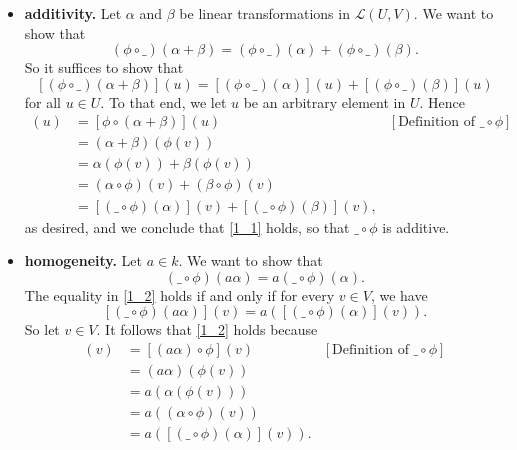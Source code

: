 \documentclass[9pt]{article}
\begin{document}
\begin{enumerate}
      \begin{itemize}
         \item \textbf{additivity.} Let $\alpha$ and $\beta$ be linear
               transformations in $\mathcal{L}(U, V)$. We want to show that
               \begin{equation} \label{1_3}
                  (\phi\circ\_)(\alpha+\beta) = (\phi\circ\_)(\alpha) +
                  (\phi\circ\_)(\beta).
               \end{equation}
               So it suffices to show that
               $$[(\phi\circ\_)(\alpha+\beta)](u) = [(\phi\circ\_)(\alpha)](u) +
                 [(\phi\circ\_)(\beta)](u)$$
               for all $u \in U$. To that end, we let $u$ be an arbitrary
               element in $U$. Hence
               \begin{align*}
                  [(\phi\circ\_)(\alpha+\beta)](u) &=
                     [\phi\circ(\alpha+\beta)](u)
                        &[\text{Definition of }\_\circ\phi ] \\
                     &= (\alpha + \beta)(\phi(v)) \\
                     &= \alpha(\phi(v)) + \beta(\phi(v)) \\
                     &= (\alpha\circ\phi)(v) + (\beta\circ\phi)(v) \\
                     &= [(\_\circ\phi)(\alpha)](v) + [(\_\circ\phi)(\beta)](v),
               \end{align*}
               as desired, and we conclude that \eqref{1_1} holds, so that
               $\_\circ\phi$ is additive.
         \item \textbf{homogeneity.} Let $a \in k$. We want to show that
               \begin{equation} \label{1_4}
                  (\_\circ\phi)(a\alpha) = a(\_\circ\phi)(\alpha).
               \end{equation}
               The equality in \eqref{1_2} holds if and only if for every
               $v \in V$, we have
               $$[(\_\circ\phi)(a\alpha)](v) = a([(\_\circ\phi)(\alpha)](v)).$$
               So let $v \in V$. It follows that \eqref{1_2} holds because
               \begin{align*}
                  [(\_\circ\phi)(a\alpha)](v) &= [(a\alpha)\circ\phi](v)
                     &[\text{Definition of }\_\circ\phi ] \\
                     &= (a\alpha)(\phi(v)) \\
                     &= a(\alpha(\phi(v))) \\
                     &= a((\alpha\circ\phi)(v)) \\
                     &= a([(\_\circ\phi)(\alpha)](v)).
               \end{align*}
      \end{itemize}
\end{enumerate}
\end{document}
